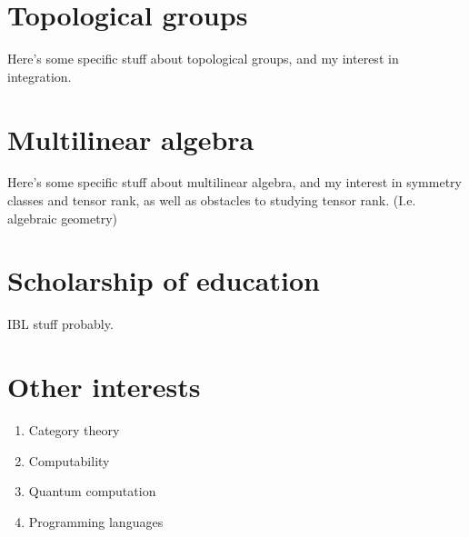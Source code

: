 \documentclass[11pt]{article}
\begin{document}
\section{Topological groups}

Here's some specific stuff about topological groups, and my interest in
integration.

\section{Multilinear algebra}

Here's some specific stuff about multilinear algebra, and my interest in
symmetry classes and tensor rank, as well as obstacles to studying tensor
rank. (I.e. algebraic geometry)

\section{Scholarship of education}

IBL stuff probably.

\section{Other interests}

\begin{enumerate}
\item Category theory
\item Computability
\item Quantum computation
\item Programming languages
\end{enumerate}
\end{document}
